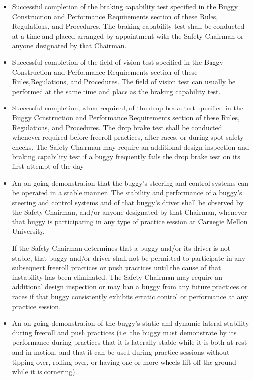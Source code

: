 	\begin{itemize}	

		\item
		Successful completion of the braking capability test specified in the Buggy
		Construction and Performance Requirements section of these Rules, Regulations,
		and Procedures. The braking capability test shall be conducted at a time and
		placed arranged by appointment with the Safety Chairman or anyone designated by
		that Chairman.

		\item
		Successful completion of the field of vision test specified in the Buggy
		Construction and Performance Requirements section of these Rules,Regulations,
		and Procedures. The field of vision test can usually be performed at the same
		time and place as the braking capability test.

		\item
		Successful completion, when required, of the drop brake test specified in the
		Buggy Construction and Performance Requirements section of these Rules,
		Regulations, and Procedures. The drop brake test shall be conducted whenever
		required before freeroll practices, after races, or during spot safety checks.
		The Safety Chairman may require an additional design inspection and braking
		capability test if a buggy frequently fails the drop brake test on its first
		attempt of the day.

		\item
		An on-going demonstration that the buggy's steering and control systems can be
		operated in a stable manner. The stability and performance of a buggy's
		steering and control systems and of that buggy's driver shall be observed by
		the Safety Chairman, and/or anyone designated by that Chairman, whenever that
		buggy is participating in any type of practice session at Carnegie Mellon
		University.

		If the Safety Chairman determines that a buggy and/or its driver is not stable,
		that buggy and/or driver shall not be permitted to participate in any
		subsequent freeroll practices or push practices until the cause of that
		instability has been eliminated. The Safety Chairman may require an additional
		design inspection or may ban a buggy from any future practices or races if that
		buggy consistently exhibits erratic control or performance at any practice
		session.

		\item
		An on-going demonstration of the buggy's static and dynamic lateral stability
		during freeroll and push practices (i.e. the buggy must demonstrate by its
		performance during practices that it is laterally stable while it is both at
		rest and in motion, and that it can be used during practice sessions without
		tipping over, rolling over, or having one or more wheels lift off the ground
		while it is cornering).


\end{itemize}
